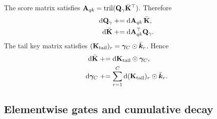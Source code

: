 The score matrix satisfies ${\mathbf{A}}_{qk}=\operatorname{tril}({\mathbf{Q}}_{\gamma}\bar{{\mathbf{K}}}^\top)$. Therefore
\begin{align}
    \mathrm{d}{\mathbf{Q}}_{\gamma}
    &\mathrel{+}=
    \mathrm{d}{\mathbf{A}}_{qk}\,\bar{{\mathbf{K}}},
\label{eq_app_dQg_from_scores}\\
    \mathrm{d}\bar{{\mathbf{K}}}
    &\mathrel{+}=
    \mathrm{d}{\mathbf{A}}_{qk}^\top{\mathbf{Q}}_{\gamma}.
\label{eq_app_dKbar_from_scores}
\end{align}
The tail key matrix satisfies $({\mathbf{K}}_{\mathrm{tail}})_{r}=\boldsymbol{\gamma}_C\odot\bar{{\bm{k}}}_r$. Hence
\begin{align}
    \mathrm{d}\bar{{\mathbf{K}}}
    &\mathrel{+}=
    \mathrm{d}{\mathbf{K}}_{\mathrm{tail}}\odot\boldsymbol{\gamma}_C,
\label{eq_app_dKbar_from_tail}\\
    \mathrm{d}\boldsymbol{\gamma}_C
    &\mathrel{+}=
    \sum_{r=1}^{C}
    \mathrm{d}({\mathbf{K}}_{\mathrm{tail}})_{r}
    \odot
    \bar{{\bm{k}}}_r .
\label{eq_app_dgammaC_from_tail}
\end{align}

\subsection{Elementwise gates and cumulative decay}
\label{app_bwd_elementwise}

